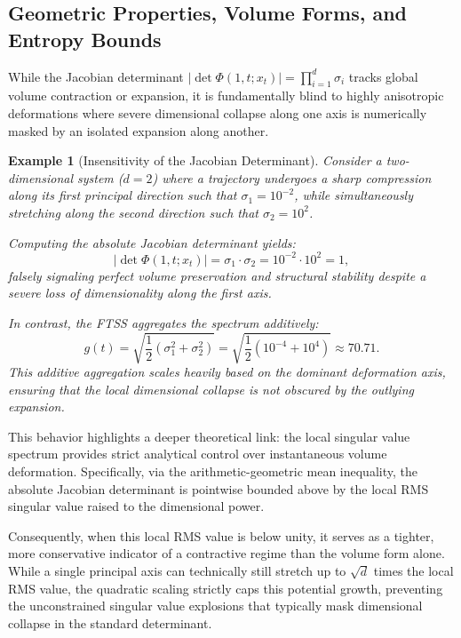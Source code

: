 \documentclass[11pt]{article}
\newtheorem{example}[theorem]{Example}
\begin{document}
\subsection{Geometric Properties, Volume Forms, and Entropy Bounds}
\label{sec:properties}

While the Jacobian determinant $|\det \Phi(1,t; x_t)| = \prod_{i=1}^d \sigma_i$ tracks global volume contraction or expansion, it is fundamentally blind to highly anisotropic deformations where severe dimensional collapse along one axis is numerically masked by an isolated expansion along another.

\begin{example}[Insensitivity of the Jacobian Determinant]
\label{ex:anisotropic_collapse}
Consider a two-dimensional system ($d=2$) where a trajectory undergoes a sharp compression along its first principal direction such that $\sigma_1 = 10^{-2}$, while simultaneously stretching along the second direction such that $\sigma_2 = 10^2$.

Computing the absolute Jacobian determinant yields:
\[
|\det \Phi(1,t; x_t)| = \sigma_1 \cdot \sigma_2 = 10^{-2} \cdot 10^2 = 1,
\]
falsely signaling perfect volume preservation and structural stability despite a severe loss of dimensionality along the first axis.

In contrast, the FTSS aggregates the spectrum additively:
\[
g(t) = \sqrt{\frac{1}{2}(\sigma_1^2 + \sigma_2^2)} = \sqrt{\frac{1}{2}(10^{-4} + 10^4)} \approx 70.71.
\]
This additive aggregation scales heavily based on the dominant deformation axis, ensuring that the local dimensional collapse is not obscured by the outlying expansion.
\end{example}

This behavior highlights a deeper theoretical link: the local singular value spectrum provides strict analytical control over instantaneous volume deformation. Specifically, via the arithmetic-geometric mean inequality, the absolute Jacobian determinant is pointwise bounded above by the local RMS singular value raised to the dimensional power.

Consequently, when this local RMS value is below unity, it serves as a tighter, more conservative indicator of a contractive regime than the volume form alone. While a single principal axis can technically still stretch up to $\sqrt{d}$ times the local RMS value, the quadratic scaling strictly caps this potential growth, preventing the unconstrained singular value explosions that typically mask dimensional collapse in the standard determinant. 
\end{document}
